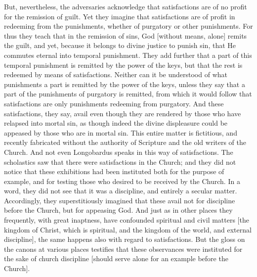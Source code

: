 But, nevertheless, the adversaries acknowledge that satisfactions are
of no profit for the remission of guilt.  Yet they imagine that
satisfactions are of profit in redeeming from the punishments,
whether of purgatory or other punishments.  For thus they teach that
in the remission of sins, God [without means, alone] remits the guilt,
and yet, because it belongs to divine justice to punish sin, that He
commutes eternal into temporal punishment.  They add further that a
part of this temporal punishment is remitted by the power of the keys,
but that the rest is redeemed by means of satisfactions.  Neither
can it be understood of what punishments a part is remitted by the
power of the keys, unless they say that a part of the punishments of
purgatory is remitted, from which it would follow that satisfactions
are only punishments redeeming from purgatory.  And these
satisfactions, they say, avail even though they are rendered by those
who have relapsed into mortal sin, as though indeed the divine
displeasure could be appeased by those who are in mortal sin.  This
entire matter is fictitious, and recently fabricated without the
authority of Scripture and the old writers of the Church.  And not
even Longobardus speaks in this way of satisfactions.  The
scholastics saw that there were satisfactions in the Church; and they
did not notice that these exhibitions had been instituted both for
the purpose of example, and for testing those who desired to be
received by the Church.  In a word, they did not see that it was a
discipline, and entirely a secular matter.  Accordingly, they
superstitiously imagined that these avail not for discipline before
the Church, but for appeasing God.  And just as in other places they
frequently, with great inaptness, have confounded spiritual and civil
matters [the kingdom of Christ, which is spiritual, and the kingdom
of the world, and external discipline], the same happens also with
regard to satisfactions.  But the gloss on the canons at various
places testifies that these observances were instituted for the sake
of church discipline [should serve alone for an example before the
Church].

